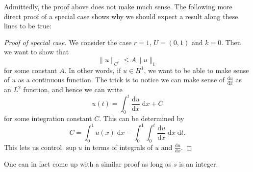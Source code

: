 \documentclass{shortart}
\theoremstyle{definition}
\renewcommand\d{\mathrm{d}}
\begin{document}
Admittedly, the proof above does not make much sense. The following more direct proof of a special case shows why we should expect a result along these lines to be true:
\begin{proof}[Proof of special case]
  We consider the case $r = 1$, $U = (0, 1)$ and $k = 0$. Then we want to show that
  \[
    \|u\|_{C^0} \leq A \|u\|_1
  \]
  for some constant $A$. In other words, if $u \in H^1$, we want to be able to make sense of $u$ as a continuous function. The trick is to notice we can make sense of $\frac{\d u}{\d x}$ as an $L^2$ function, and hence we can write
  \[
    u(t) = \int_0^t \frac{\d u}{\d x}\;\d x + C
  \]
  for some integration constant $C$. This can be determined by
  \[
    C = \int_0^1 u(x)\;\d x - \int_0^1 \int_0^t \frac{\d u}{\d x}\;\d x\;\d t.
  \]
  This lets us control $\sup u$ in terms of integrals of $u$ and $\frac{\d u}{\d x}$.
\end{proof}
One can in fact come up with a similar proof as long as $s$ is an integer.
\end{document}
